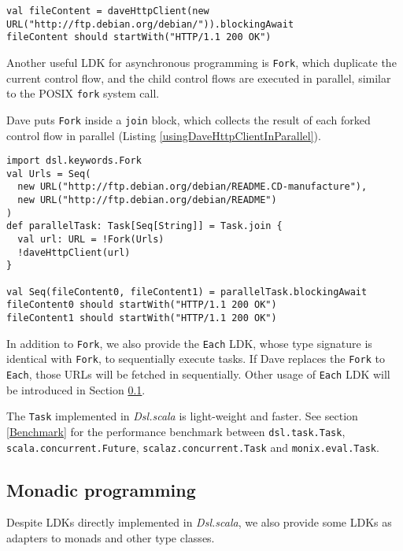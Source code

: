 \begin{lstlisting}[caption={Using Dave's http client},label={usingDaveHttpClient}]
val fileContent = daveHttpClient(new URL("http://ftp.debian.org/debian/")).blockingAwait
fileContent should startWith("HTTP/1.1 200 OK")
\end{lstlisting}


Another useful LDK for asynchronous programming is \lstinline{Fork}, which duplicate the current control flow, and the child control flows are executed in parallel, similar to the POSIX \lstinline{fork} system call.

Dave puts \lstinline{Fork} inside a \lstinline{join} block, which collects the result of each forked control flow in parallel (Listing \ref{usingDaveHttpClientInParallel}).

\begin{lstlisting}[caption={Using Dave's http client in parallel},label={usingDaveHttpClientInParallel}]
import dsl.keywords.Fork
val Urls = Seq(
  new URL("http://ftp.debian.org/debian/README.CD-manufacture"),
  new URL("http://ftp.debian.org/debian/README")
)
def parallelTask: Task[Seq[String]] = Task.join {
  val url: URL = !Fork(Urls)
  !daveHttpClient(url)
}

val Seq(fileContent0, fileContent1) = parallelTask.blockingAwait
fileContent0 should startWith("HTTP/1.1 200 OK")
fileContent1 should startWith("HTTP/1.1 200 OK")
\end{lstlisting}

In addition to \lstinline{Fork}, we also provide the \lstinline{Each} LDK, whose type signature is identical with \lstinline{Fork}, to sequentially execute tasks. If Dave replaces the \lstinline{Fork} to \lstinline{Each}, those URLs will be fetched in sequentially. Other usage of \lstinline{Each} LDK will be introduced in Section \ref{Monadic programming}.

The \lstinline{Task} implemented in \textit{Dsl.scala} is light-weight and faster. See section \ref{Benchmark} for the performance benchmark between \lstinline{dsl.task.Task}, \lstinline{scala.concurrent.Future}, \lstinline{scalaz.concurrent.Task} and \lstinline{monix.eval.Task}.

\subsection{Monadic programming}\label{Monadic programming}

Despite LDKs directly implemented in \textit{Dsl.scala}, we also provide some LDKs as adapters to monads and other type classes.

